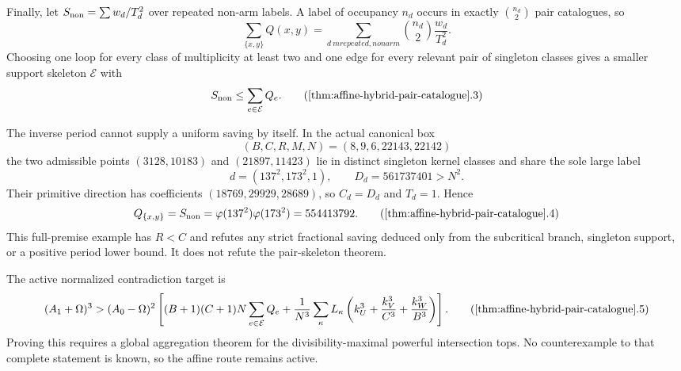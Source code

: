 Finally, let $S_{\rm non}=\sum w_d/T_d^2$ over repeated non-arm labels.
A label of occupancy $n_d$ occurs in exactly $\binom{n_d}{2}$ pair
catalogues, so
\[
 \sum_{\{x,y\}}Q(x,y)
 =\sum_{d\ {
m repeated,nonarm}}\binom{n_d}{2}\frac{w_d}{T_d^2}.
\]
Choosing one loop for every class of multiplicity at least two and one edge
for every relevant pair of singleton classes gives a smaller support
skeleton $\mathcal E$ with
\[
                         S_{\rm non}\le\sum_{e\in\mathcal E}Q_e.       \tag{\ref{thm:affine-hybrid-pair-catalogue}.3}
\]

The inverse period cannot supply a uniform saving by itself.  In the actual
canonical box
\[
 (B,C,R,M,N)=(8,9,6,22143,22142)
\]
the two admissible points $(3128,10183)$ and $(21897,11423)$ lie in distinct
singleton kernel classes and share the sole large label
\[
 d=(137^2,173^2,1),\qquad D_d=561737401>N^2.
\]
Their primitive direction has coefficients
$(18769,29929,28689)$, so $C_d=D_d$ and $T_d=1$.  Hence
\[
 Q_{\{x,y\}}=S_{\rm non}
 =\varphi(137^2)\varphi(173^2)=554413792.               \tag{\ref{thm:affine-hybrid-pair-catalogue}.4}
\]
This full-premise example has $R<C$ and refutes any strict fractional saving
deduced only from the subcritical branch, singleton support, or a positive
period lower bound.  It does not refute the pair-skeleton theorem.

The active normalized contradiction target is
\[
 (A_1+\Omega)^3>(A_0-\Omega)^2\left[
 (B+1)(C+1)N\sum_{e\in\mathcal E}Q_e+
 \frac1{N^3}\sum_\kappa L_\kappa
 \left(k_U^3+\frac{k_V^3}{C^3}+\frac{k_W^3}{B^3}\right)
 \right].                                               \tag{\ref{thm:affine-hybrid-pair-catalogue}.5}
\]
Proving this requires a global aggregation theorem for the
divisibility-maximal powerful intersection tops.  No counterexample to that
complete statement is known, so the affine route remains active.
